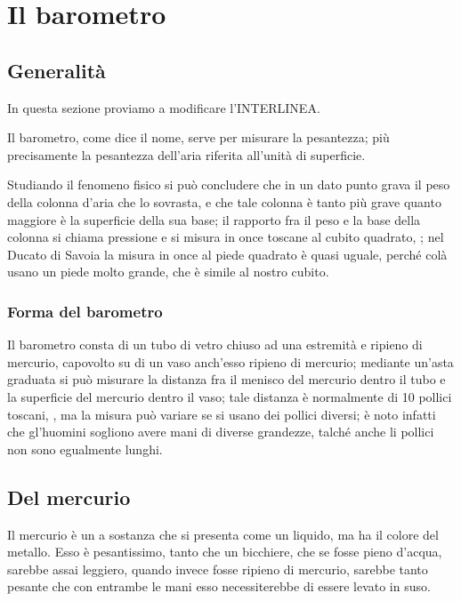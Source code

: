 \chapter{Il barometro}
\section{Generalit\`a}
In questa sezione proviamo a modificare l'INTERLINEA.\\

\begin{interlinea}{0.87}
Il barometro, come dice il nome, serve per misurare la pesantezza; pi\`u precisamente la pesantezza dell'aria riferita all'unit\`a di superficie.
\end{interlinea}

\begin{interlinea}{2}
Studiando il fenomeno fisico si pu\`o concludere che in un dato punto grava il peso della colonna d'aria che lo sovrasta, e che tale colonna \`e tanto pi\`u grave quanto maggiore \`e la superficie della sua base; il rapporto fra il peso e la base della colonna si chiama pressione e si misura in once toscane al cubito quadrato, \cite{tor1}; nel Ducato di Savoia la misura in once al piede quadrato \`e quasi uguale, perch\'e col\`a usano un piede molto grande, che \`e simile al nostro cubito.
\end{interlinea}

\subsection{Forma del barometro}
Il barometro consta di un tubo di vetro chiuso ad una estremit\`a e ripieno di mercurio, capovolto su di un vaso anch'esso ripieno di mercurio; mediante un'asta graduata si pu\`o misurare la distanza fra il menisco del mercurio dentro il tubo e la superficie del mercurio dentro il vaso; tale distanza \`e normalmente di 10 pollici toscani, \cite{tor1,tor2}, ma la misura pu\`o variare se si usano dei pollici diversi; \`e noto infatti che gl'huomini sogliono avere mani di diverse grandezze, talch\'e anche li pollici non sono egualmente lunghi.

\section{Del mercurio}
Il mercurio \`e un a sostanza che si presenta come un liquido, ma ha il colore del metallo. Esso \`e pesantissimo, tanto che un bicchiere, che se fosse pieno d'acqua, sarebbe assai leggiero, quando invece fosse ripieno di mercurio, sarebbe tanto pesante che con entrambe le mani esso necessiterebbe di essere levato in suso.


